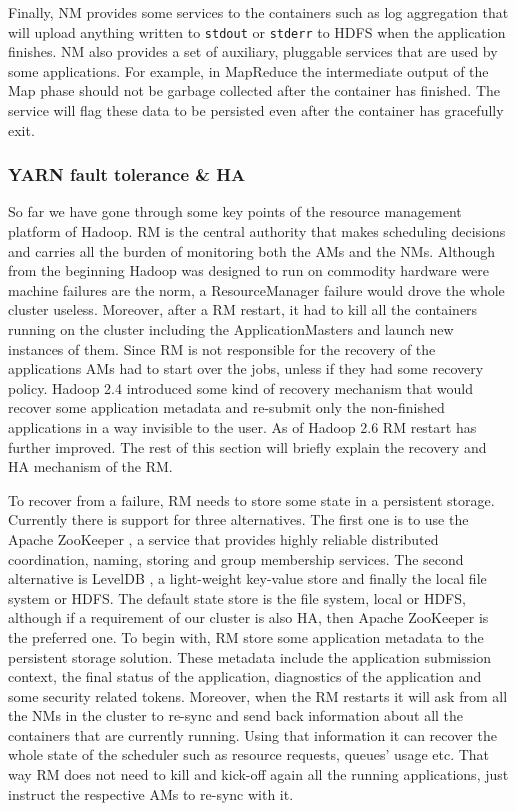 Finally, NM provides some services to the containers such as log
aggregation that will upload anything written to \texttt{stdout} or \texttt{stderr} to
HDFS when the application finishes. NM also provides a set of
auxiliary, pluggable services that are used by some applications. For
example, in MapReduce the intermediate output of the Map phase should
not be garbage collected after the container has finished. The
service will flag these data to be persisted even after the container
has gracefully exit.

\subsubsection{YARN fault tolerance \& HA}
\label{sssec:yarn_ha}
So far we have gone through some key points of the resource management
platform of Hadoop. RM is the central authority that makes scheduling
decisions and carries all the burden of monitoring both the AMs and
the NMs. Although from the beginning Hadoop was designed to run on
commodity hardware were machine failures are the norm, a
ResourceManager failure would drove the whole cluster
useless. Moreover, after a RM restart, it had to kill all the
containers running on the cluster including the ApplicationMasters and
launch new instances of them. Since RM is not responsible for the
recovery of the applications AMs had to start over the jobs, unless if
they had some recovery policy. Hadoop 2.4 introduced some kind of recovery mechanism that would
recover some application metadata and re-submit only the non-finished
applications in a way invisible to the user. As of Hadoop 2.6 RM
restart has further improved. The rest of this section will briefly
explain the recovery and HA mechanism of the RM.

To recover from a failure, RM needs to
store some state in a persistent storage. Currently there is support
for three alternatives. The first one is to use the Apache ZooKeeper
\cite{apache_zookeeper}, a service that provides highly reliable
distributed coordination, naming, storing and group membership
services. The second alternative is LevelDB \cite{google_leveldb},
a light-weight key-value store and finally the local file system or
HDFS. The default state store is the file system, local or HDFS, although
if a requirement of our cluster is also HA, then Apache ZooKeeper is
the preferred one. To begin with, RM store some application metadata to
the persistent storage solution. These metadata include the
application submission context, the final status of the application,
diagnostics of the application and some security related
tokens. Moreover, when the RM restarts it will ask from all the NMs in
the cluster to re-sync and send back information about all the
containers that are currently running. Using that information it can
recover the whole state of the scheduler such as resource requests,
queues' usage etc. That way RM does not need to kill and kick-off again all
the running applications, just instruct the respective AMs to re-sync
with it.

